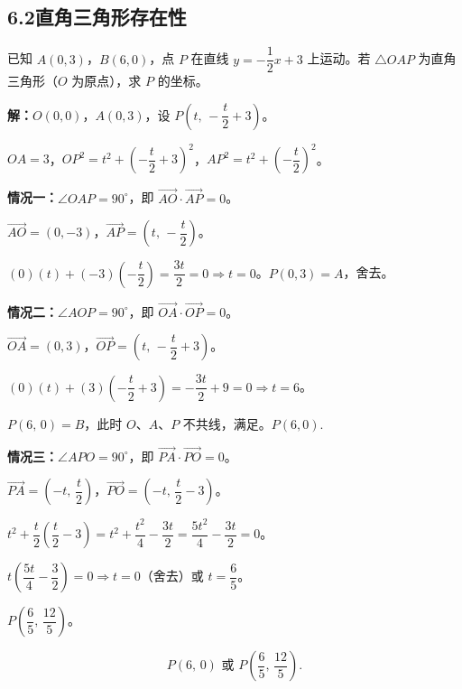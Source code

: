 \documentclass[12pt, a4paper]{ctexart}
\begin{document}
\subsection*{6.2\quad 直角三角形存在性}

\begin{examplebox}[【例16】直角三角形存在性]
已知 $A(0,3)$，$B(6,0)$，点 $P$ 在直线 $y=-\dfrac{1}{2}x+3$ 上运动。若 $\triangle OAP$ 为直角三角形（$O$ 为原点），求 $P$ 的坐标。

\begin{center}
\end{center}

\textbf{解：}$O(0,0)$，$A(0,3)$，设 $P\!\left(t,\,-\dfrac{t}{2}+3\right)$。

$OA=3$，$OP^2=t^2+\left(-\dfrac{t}{2}+3\right)^2$，$AP^2=t^2+\left(-\dfrac{t}{2}\right)^2$。

\textbf{情况一：}$\angle OAP=90^\circ$，即 $\vec{AO}\cdot\vec{AP}=0$。

$\vec{AO}=(0,-3)$，$\vec{AP}=\left(t,\,-\dfrac{t}{2}\right)$。

$(0)(t)+(-3)\!\left(-\dfrac{t}{2}\right)=\dfrac{3t}{2}=0\Rightarrow t=0$。$P(0,3)=A$，舍去。

\textbf{情况二：}$\angle AOP=90^\circ$，即 $\vec{OA}\cdot\vec{OP}=0$。

$\vec{OA}=(0,3)$，$\vec{OP}=\left(t,\,-\dfrac{t}{2}+3\right)$。

$(0)(t)+(3)\!\left(-\dfrac{t}{2}+3\right)=-\dfrac{3t}{2}+9=0\Rightarrow t=6$。

$P(6,\,0)=B$，此时 $O$、$A$、$P$ 不共线，满足。$\boxed{P(6,0).}$

\textbf{情况三：}$\angle APO=90^\circ$，即 $\vec{PA}\cdot\vec{PO}=0$。

$\vec{PA}=\left(-t,\,\dfrac{t}{2}\right)$，$\vec{PO}=\left(-t,\,\dfrac{t}{2}-3\right)$。

$t^2+\dfrac{t}{2}\!\left(\dfrac{t}{2}-3\right)=t^2+\dfrac{t^2}{4}-\dfrac{3t}{2}=\dfrac{5t^2}{4}-\dfrac{3t}{2}=0$。

$t\!\left(\dfrac{5t}{4}-\dfrac{3}{2}\right)=0\Rightarrow t=0$（舍去）或 $t=\dfrac{6}{5}$。

$P\!\left(\dfrac{6}{5},\,\dfrac{12}{5}\right)$。

\[\boxed{P(6,\,0) \text{ 或 } P\!\left(\frac{6}{5},\,\frac{12}{5}\right).}\]
\end{examplebox}
\end{document}
